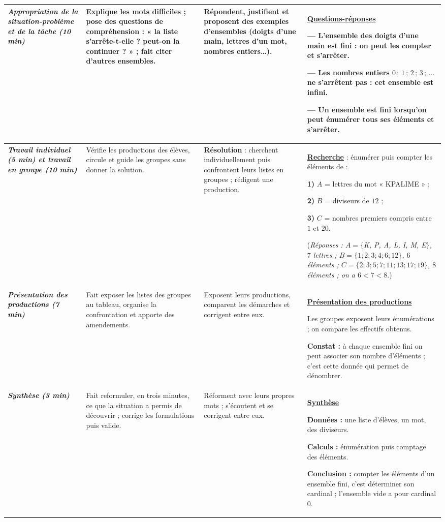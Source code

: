 \documentclass[10pt]{article}
\newcommand{\titreR}[1]{\underline{\textcolor{rougetitre}{\bfseries #1}}}
\newcommand{\moment}[1]{\textbf{\itshape #1}}
\newcommand{\mclef}[1]{\colorbox{jaunesurl}{#1}}
\begin{document}
\begin{longtable}{|p{2.35cm}|p{5.35cm}|p{4.55cm}|p{13.85cm}|}
\moment{Appropriation de la situation-problème et de la tâche (10 min)} &
Explique les mots difficiles ; pose des questions de compréhension : « la liste
s'arrête-t-elle ? peut-on la continuer ? » ; fait citer d'autres ensembles. &
Répondent, justifient et proposent des exemples d'ensembles (doigts d'une main,
lettres d'un mot, nombres entiers…). &
\titreR{Questions-réponses} \par
— L'ensemble des doigts d'une main est fini : on peut les compter et s'arrêter. \par
— Les nombres entiers $0\,;\,1\,;\,2\,;\,3\,;\,\dots$ ne s'arrêtent pas : cet ensemble
est infini. \par
— Un ensemble est \mclef{fini} lorsqu'on peut énumérer tous ses éléments et s'arrêter. \\ \hline

\moment{Travail individuel (5 min) et travail en groupe (10 min)} &
Vérifie les productions des élèves, circule et guide les groupes sans donner la solution. &
\textbf{Résolution} : cherchent individuellement puis confrontent leurs listes en
groupes ; rédigent une production. &
\titreR{Recherche} : énumérer puis compter les éléments de : \par
\textbf{1)} $A$ = lettres du mot « KPALIME » ; \par
\textbf{2)} $B$ = diviseurs de $12$ ; \par
\textbf{3)} $C$ = nombres premiers compris entre $1$ et $20$. \par
(\textit{Réponses : $A=\{$K, P, A, L, I, M, E$\}$, $7$ lettres ; $B=\{1;2;3;4;6;12\}$,
$6$ éléments ; $C=\{2;3;5;7;11;13;17;19\}$, $8$ éléments ; on a
$6<7<8$}.) \\ \hline

\moment{Présentation des productions (7 min)} &
Fait exposer les listes des groupes au tableau, organise la confrontation et apporte
des amendements. &
Exposent leurs productions, comparent les démarches et corrigent entre eux. &
\titreR{Présentation des productions} \par
Les groupes exposent leurs énumérations ; on compare les effectifs obtenus. \par
\textbf{Constat :} à chaque ensemble fini on peut associer son nombre d'éléments ;
c'est cette donnée qui permet de \mclef{dénombrer}. \\ \hline

\moment{Synthèse (3 min)} &
Fait reformuler, en trois minutes, ce que la situation a permis de découvrir ;
corrige les formulations puis valide. &
Réforment avec leurs propres mots ; s'écoutent et se corrigent entre eux. &
\titreR{Synthèse} \par
\textbf{Données :} une liste d'élèves, un mot, des diviseurs. \par
\textbf{Calculs :} énumération puis comptage des éléments. \par
\textbf{Conclusion :} compter les éléments d'un ensemble fini, c'est déterminer son
\mclef{cardinal} ; l'ensemble vide a pour cardinal $0$. \\ \hline


\end{longtable}
\end{document}
